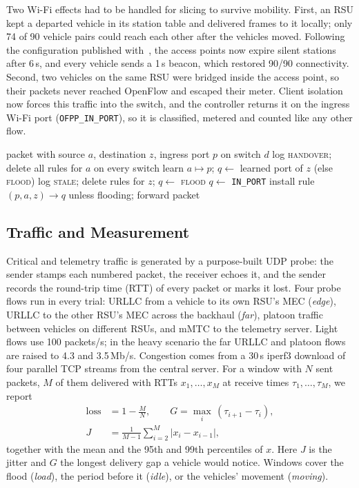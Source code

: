 \documentclass[conference]{IEEEtran}
\begin{document}
Two Wi-Fi effects had to be handled for slicing to survive mobility. First, an RSU kept a departed vehicle in its station table and delivered frames to it locally; only 74 of 90 vehicle pairs could reach each other after the vehicles moved. Following the configuration published with~\cite{saraiva2021its}, the access points now expire silent stations after 6\,s, and every vehicle sends a 1\,s beacon, which restored 90/90 connectivity. Second, two vehicles on the same RSU were bridged inside the access point, so their packets never reached OpenFlow and escaped their meter. Client isolation now forces this traffic into the switch, and the controller returns it on the ingress Wi-Fi port (\texttt{OFPP\_IN\_PORT}), so it is classified, metered and counted like any other flow.

\begin{algorithm}[t]
\caption{Mobility-aware packet-in handling}
\label{alg:pktin}
\footnotesize
\begin{algorithmic}[1]
\Require packet with source $a$, destination $z$, ingress port $p$ on switch $d$
 \State log \textsc{handover}; delete all rules for $a$ on every switch \EndIf
\State learn $a \mapsto p$; $q \gets$ learned port of $z$ (else \textsc{flood})
 \State log \textsc{stale}; delete rules for $z$; $q \gets$ \textsc{flood} \EndIf
{} \State $q \gets$ \texttt{IN\_PORT}  \EndIf
\State install rule $(p,a,z)\to q$ unless flooding; forward packet
\end{algorithmic}
\end{algorithm}

\subsection{Traffic and Measurement}
Critical and telemetry traffic is generated by a purpose-built UDP probe: the sender stamps each numbered packet, the receiver echoes it, and the sender records the round-trip time (RTT) of every packet or marks it lost. Four probe flows run in every trial: URLLC from a vehicle to its own RSU's MEC (\emph{edge}), URLLC to the other RSU's MEC across the backhaul (\emph{far}), platoon traffic between vehicles on different RSUs, and mMTC to the telemetry server. Light flows use 100 packets/s; in the heavy scenario the far URLLC and platoon flows are raised to 4.3 and 3.5\,Mb/s. Congestion comes from a 30\,s iperf3 download of four parallel TCP streams from the central server. For a window with $N$ sent packets, $M$ of them delivered with RTTs $x_1,\dots,x_M$ at receive times $\tau_1,\dots,\tau_M$, we report
\begin{align}
\text{loss} &= 1-\frac{M}{N}, \qquad G=\max_i\,(\tau_{i+1}-\tau_i), \label{eq:metrics}\\
J &= \frac{1}{M-1}\sum_{i=2}^{M}|x_i-x_{i-1}|, \nonumber
\end{align}
together with the mean and the 95th and 99th percentiles of $x$. Here $J$ is the jitter and $G$ the longest delivery gap a vehicle would notice. Windows cover the flood (\emph{load}), the period before it (\emph{idle}), or the vehicles' movement (\emph{moving}).
\end{document}
